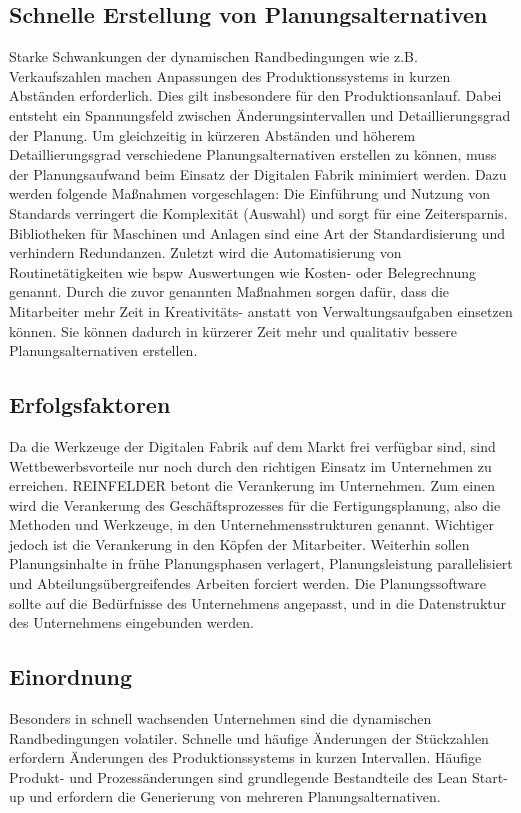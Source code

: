 \subsection{Schnelle Erstellung von Planungsalternativen}

Starke Schwankungen der dynamischen Randbedingungen wie z.B. Verkaufszahlen machen Anpassungen des Produktionssystems in kurzen Abständen erforderlich. Dies gilt insbesondere für den Produktionsanlauf. Dabei entsteht ein Spannungsfeld zwischen Änderungsintervallen und Detaillierungsgrad der Planung. Um gleichzeitig in kürzeren Abständen und höherem Detaillierungsgrad verschiedene Planungsalternativen erstellen zu können, muss der Planungsaufwand beim Einsatz der Digitalen Fabrik minimiert werden. 
Dazu werden folgende Maßnahmen vorgeschlagen: 
Die Einführung und Nutzung von Standards verringert die Komplexität (Auswahl) und sorgt für eine Zeitersparnis. Bibliotheken für Maschinen und Anlagen sind eine Art der Standardisierung und verhindern Redundanzen. Zuletzt wird die Automatisierung von Routinetätigkeiten wie \gls{bspw} Auswertungen wie Kosten- oder Belegrechnung genannt.
Durch die zuvor genannten Maßnahmen sorgen dafür, dass die Mitarbeiter mehr Zeit in Kreativitäts- anstatt von Verwaltungsaufgaben einsetzen können. Sie können dadurch in kürzerer Zeit mehr und qualitativ bessere Planungsalternativen erstellen. 

\subsection{Erfolgsfaktoren}

Da die Werkzeuge der Digitalen Fabrik auf dem Markt frei verfügbar sind, sind Wettbewerbsvorteile nur noch durch den richtigen Einsatz im Unternehmen zu erreichen. 
REINFELDER betont die Verankerung im Unternehmen. Zum einen wird die Verankerung des Geschäftsprozesses für die Fertigungsplanung, also die Methoden und Werkzeuge, in den Unternehmensstrukturen genannt. Wichtiger jedoch ist die Verankerung in den Köpfen der Mitarbeiter. 
Weiterhin sollen Planungsinhalte in frühe Planungsphasen verlagert, Planungsleistung parallelisiert und Abteilungsübergreifendes Arbeiten forciert werden. Die Planungssoftware sollte auf die Bedürfnisse des Unternehmens angepasst, und in die Datenstruktur des Unternehmens eingebunden werden. 

\subsection{Einordnung}

Besonders in schnell wachsenden Unternehmen sind die dynamischen Randbedingungen volatiler. Schnelle und häufige Änderungen der Stückzahlen erfordern Änderungen des Produktionssystems in kurzen Intervallen. Häufige Produkt- und Prozessänderungen sind grundlegende Bestandteile des Lean Start-up und erfordern die Generierung von mehreren Planungsalternativen. 




